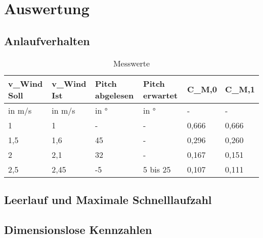 \section{Auswertung}
\label{sec:Auswertung}
\subsection{Anlaufverhalten}
\begin{table}[ht!]
    \centering
    \caption{Messwerte}
    \label{tab_Messwerte_Anlauf_230615}
    \begin{tabular}{|l|l|l|l|l|l|}
    \hline
    \rowcolor[HTML]{70AD47} 
    {\color[HTML]{FFFFFF} \textbf{v\_Wind   Soll}} & {\color[HTML]{FFFFFF} \textbf{v\_Wind Ist}} & {\color[HTML]{FFFFFF} \textbf{Pitch abgelesen}} & {\color[HTML]{FFFFFF} \textbf{Pitch erwartet}} & {\color[HTML]{FFFFFF} \textbf{C\_M,0}} & {\color[HTML]{FFFFFF} \textbf{C\_M,1}} \\ \hline
    \rowcolor[HTML]{70AD47} 
    in m/s                                         & in m/s                                      & in °                                            & in °                                           & -                                      & -                                      \\ \hline
    \rowcolor[HTML]{E2EFDA} 
    1                                              & 1                                           & -                                               & -                                              & 0,666                                  & 0,666                                  \\ \hline
    \rowcolor[HTML]{C6E0B4} 
    1,5                                            & 1,6                                         & 45                                              & -                                              & 0,296                                  & 0,260                                  \\ \hline
    \rowcolor[HTML]{E2EFDA} 
    2                                              & 2,1                                         & 32                                              & -                                              & 0,167                                  & 0,151                                  \\ \hline
    \rowcolor[HTML]{C6E0B4} 
    2,5                                            & 2,45                                        & -5                                              & 5 bis 25                                       & 0,107                                  & 0,111                                  \\ \hline
    \end{tabular}
    \end{table}

\subsection{Leerlauf und Maximale Schnelllaufzahl}








\subsection{Dimensionslose Kennzahlen}
